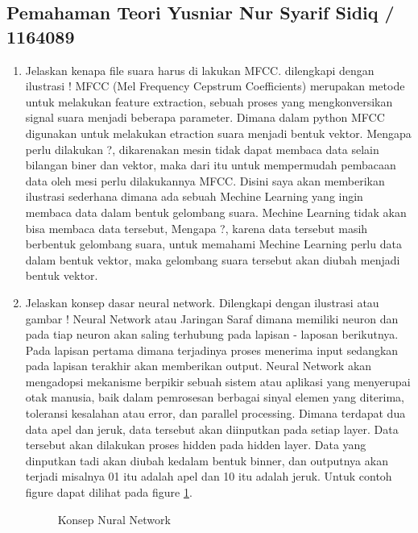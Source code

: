 \subsection{Pemahaman Teori Yusniar Nur Syarif Sidiq / 1164089}
\begin{enumerate}

\item Jelaskan kenapa file suara harus di lakukan MFCC. dilengkapi dengan ilustrasi !
	\subitem MFCC (Mel Frequency Cepstrum Coefficients) merupakan metode untuk melakukan feature extraction, sebuah proses yang mengkonversikan signal suara menjadi beberapa parameter. Dimana dalam python MFCC digunakan untuk melakukan etraction suara menjadi bentuk vektor. Mengapa perlu dilakukan ?, dikarenakan mesin tidak dapat membaca data selain bilangan biner dan vektor, maka dari itu untuk mempermudah pembacaan data oleh mesi perlu dilakukannya MFCC. Disini saya akan memberikan ilustrasi sederhana dimana ada sebuah Mechine Learning yang ingin membaca data dalam bentuk gelombang suara. Mechine Learning tidak akan bisa membaca data tersebut, Mengapa ?, karena data tersebut masih berbentuk gelombang suara, untuk memahami Mechine Learning perlu data dalam bentuk vektor, maka gelombang suara tersebut akan diubah menjadi bentuk vektor.

\item Jelaskan konsep dasar neural network. Dilengkapi dengan ilustrasi atau gambar !
	\subitem Neural Network atau Jaringan Saraf dimana memiliki neuron dan pada tiap neuron akan saling terhubung pada lapisan - laposan berikutnya. Pada lapisan pertama dimana terjadinya proses menerima input sedangkan pada lapisan terakhir akan memberikan output. Neural Network akan mengadopsi mekanisme berpikir sebuah sistem atau aplikasi yang menyerupai otak manusia, baik dalam pemrosesan berbagai sinyal elemen yang diterima, toleransi kesalahan atau error, dan parallel processing. Dimana terdapat dua data apel dan jeruk, data tersebut akan diinputkan pada setiap layer. Data tersebut akan dilakukan proses hidden pada hidden layer. Data yang dinputkan tadi akan diubah kedalam bentuk binner, dan outputnya akan terjadi misalnya 01 itu adalah apel dan 10 itu adalah jeruk. Untuk contoh figure dapat dilihat pada figure \ref{YNC6-1}.

	\begin{figure}[!htbp]
		\caption{Konsep Nural Network}
		\label{YNC6-1}
	\end{figure}


\end{enumerate}
